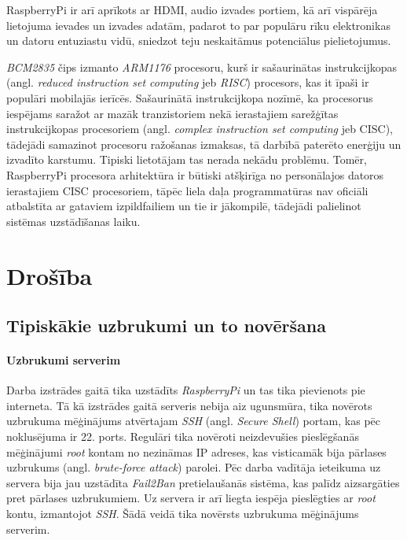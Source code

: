 RaspberryPi ir arī aprīkots ar HDMI, audio izvades portiem, kā arī vispārēja lietojuma ievades un izvades adatām, padarot to par populāru rīku elektronikas un datoru entuziastu vidū, sniedzot teju neskaitāmus potenciālus pielietojumus.

\textit{BCM2835} čips izmanto \textit{ARM1176} procesoru, kurš ir sašaurinātas instrukcijkopas (angl. \textit{reduced instruction set computing} jeb \textit{RISC}) procesors, kas it īpaši ir populāri mobilajās ierīcēs. Sašaurinātā instrukcijkopa nozīmē, ka procesorus iespējams saražot ar mazāk tranzistoriem nekā ierastajiem sarežģītas instrukcijkopas procesoriem (angl. \textit{complex instruction set computing} jeb CISC), tādejādi samazinot procesoru ražošanas izmaksas, tā darbībā paterēto enerģiju un izvadīto karstumu.
Tipiski lietotājam tas nerada nekādu problēmu. Tomēr, RaspberryPi procesora arhitektūra ir būtiski atšķirīga no personālajos datoros ierastajiem CISC procesoriem, tāpēc liela daļa programmatūras nav oficiāli atbalstīta ar gataviem izpildfailiem un tie ir jākompilē, tādejādi palielinot sistēmas uzstādīšanas laiku.

\chapter{Drošība}

\section{Tipiskākie uzbrukumi un to novēršana} \label{Attacks}
\subsubsection{Uzbrukumi serverim}
Darba izstrādes gaitā tika uzstādīts \textit{RaspberryPi} un tas tika pievienots pie interneta. Tā kā izstrādes gaitā serveris nebija aiz ugunsmūra, tika novērots uzbrukuma mēģinājums atvērtajam \textit{SSH} (angl. \textit{Secure Shell}) portam, kas pēc noklusējuma ir 22. ports. Regulāri tika novēroti neizdevušies pieslēgšanās mēģinājumi \textit{root} kontam no nezināmas IP adreses, kas visticamāk bija pārlases uzbrukums (angl. \textit{brute-force attack}) parolei. Pēc darba vadītāja ieteikuma uz servera bija jau uzstādīta \textit{Fail2Ban} pretielaušanās sistēma, kas palīdz aizsargāties pret pārlases uzbrukumiem. Uz servera ir arī liegta iespēja pieslēgties ar \textit{root} kontu, izmantojot \textit{SSH}. Šādā veidā tika novērsts uzbrukuma mēģinājums serverim.


